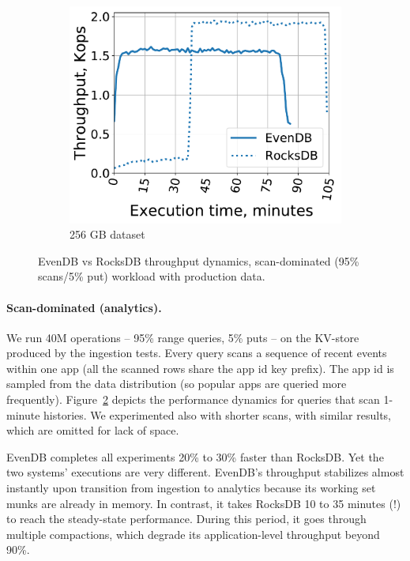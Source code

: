 \documentclass[sigplan,10pt]{acmart}
\newcommand{\sys}{EvenDB}
\begin{document}
\begin{figure}[tb]
\begin{subfigure}{0.32\linewidth}
\includegraphics[width=\textwidth]{figs/throughput_256_scans_10s_line.pdf}
\caption{256 GB dataset}
\label{fig:prod:analytics:c}
\end{subfigure}
\caption{\sys\/ vs RocksDB throughput dynamics,  scan-dominated (95\% scans/5\% put) workload with production data.}
\label{fig:prod:analytics}
\end{figure}

\paragraph{Scan-dominated (analytics).} We run 40M operations -- 95\% range queries, 5\% puts -- 
on the KV-store produced by the ingestion tests.
Every query scans a sequence of recent events within one app (all the scanned rows 
share the  app id key prefix).  
The app id is sampled from the data distribution (so popular apps are queried more frequently).  
Figure~\ref{fig:prod:analytics} depicts the performance dynamics for queries that scan 1-minute histories.
We experimented also with shorter scans, with similar results, which are omitted for lack of space.

\sys\/ completes all experiments 20\% to 30\% faster than RocksDB. 
Yet the two systems' executions are very different. \sys's throughput stabilizes 
almost instantly upon transition from ingestion to analytics because its working set munks are already 
in memory. In contrast, it takes RocksDB 10 to 35 minutes (!) to reach the steady-state performance. 
During this period, it goes through multiple compactions, which degrade its application-level throughput 
beyond 90\%. 
\end{document}
